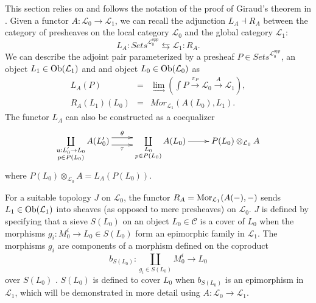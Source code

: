 \documentclass[aps,twocolumn]{revtex4-1}
\begin{document}
This section relies on and follows the notation of the proof of Giraud's theorem in \cite{MacLane1992}. Given a functor $A: \mathcal{L}_0 \rightarrow \mathcal{L}_1$, we can recall the adjunction $L_A \dashv R_A$ between the category of presheaves on the local category $\mathcal{L}_0$ and the global category $\mathcal{L}_1$:
$$
L_A: \textit{Sets}^{\mathcal{L}_0^{opp}} \leftrightarrows \mathcal{L}_1 :R_A.
$$
We can describe the adjoint pair parameterized by a presheaf $P \in \textit{Sets}^{\mathcal{L}_0^{opp}}$, an object $L_1 \in \mathop{\rm Ob}\nolimits(\mathcal{L}_1)$ and and object $L_0 \in \mathop{\rm Ob}\nolimits(\mathcal{L}_0)$ as
\begin{eqnarray*}
L_A(P) &=& \lim\limits_{\longrightarrow} \left( \int P \xrightarrow{\pi_P} \mathcal{L}_0 \xrightarrow{A} \mathcal{L}_1 \right),\\
R_A(L_1)(L_0) &=& Mor_{\mathcal{L}_1}(A(L_0),L_1).
\end{eqnarray*}
The functor $L_A$ can also be constructed as a coequalizer
\begin{displaymath}
\xymatrix{
\coprod\limits_{\substack{u : L'_0 \rightarrow L_0 \\ p \in P(L_0)}}
A(L'_0)
\ar@<1ex>[r]^-{\theta} \ar@<-1ex>[r]_-{\tau}
&
\coprod\limits_{\substack{L_0 \\ p \in P(L_0)}}
A(L_0)
\ar[r]
&
P(L_0) \otimes_{\mathcal{L}_0} A
}
\end{displaymath}
where $P(L_0) \otimes_{\mathcal{L}_0} A = L_A(P(L_0))$.

For a suitable topology $J$ on $\mathcal{L}_0$, the functor $R_A = \mathop{\rm Mor}\nolimits_{\mathcal{L}_1}(A(-),-)$ sends $L_1 \in \mathop{\rm Ob}\nolimits(\mathcal{L}_1)$ into sheaves (as opposed to mere presheaves) on $\mathcal{L}_0$. $J$ is defined by specifying that a sieve $S(L_0)$ on an object $L_0 \in \mathcal{C}$ is a cover of $L_0$ when the morphisms $g_i : M_0^i \rightarrow L_0 \in S(L_0)$ form an epimorphic family in $\mathcal{L}_1$. The morphisms $g_i$ are components of a morphism defined on the coproduct
$$
b_{S(L_0)} : \coprod\limits_{g_i \in S(L_0)} M_0^i \longrightarrow L_0
$$
over $S(L_0)$ . $S(L_0)$ is defined to cover $L_0$ when $b_{S(L_0)}$ is an epimorphism in $\mathcal{L}_1$, which will be demonstrated in more detail using $A:\mathcal{L}_0 \rightarrow \mathcal{L}_1$.
\end{document}
